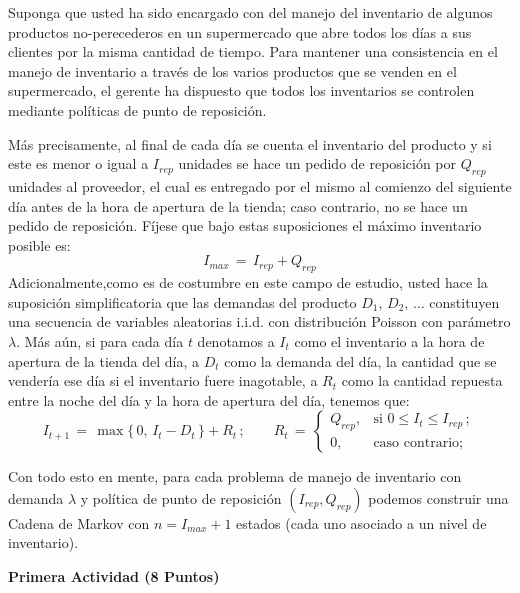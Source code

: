 \documentclass[ a4paper, twoside, 11pt]{article}
\begin{document}
\begin{problem}
Suponga que usted ha sido encargado con del manejo del inventario de algunos productos no-perecederos en un supermercado que abre todos los d\'ias a sus clientes por la misma cantidad de tiempo. Para mantener una consistencia en el manejo de inventario a trav\'es de los varios productos que se venden en el supermercado, el gerente ha dispuesto que todos los inventarios se controlen mediante pol\'iticas de punto de reposici\'on. 

M\'as precisamente, al final de cada d\'ia se cuenta el inventario del producto y si este es menor o igual a $I_{rep}$ unidades se hace un pedido de reposici\'on por $Q_{rep}$ unidades al proveedor, el cual es entregado por el mismo al comienzo del siguiente d\'ia antes de la hora de apertura de la tienda; caso contrario, no se hace un pedido de reposici\'on. F\'ijese que bajo estas suposiciones el m\'aximo inventario posible es:
\[
I_{max} \, = \, I_{rep} + Q_{rep}
\]
Adicionalmente,como es de costumbre en este campo de estudio, usted hace la suposici\'on simplificatoria que las demandas del producto $D_1, \, D_2, \, \dots$ constituyen una secuencia de variables aleatorias i.i.d. con distribuci\'on Poisson con par\'ametro $\lambda$. M\'as a\'un, si para cada d\'ia $t$ denotamos a $I_t$ como el inventario a la hora de apertura de la tienda del \tavo d\'ia, a $D_t$ como la demanda del d\'ia, \ie la cantidad que se vender\'ia ese d\'ia si el inventario fuere inagotable, a $R_t$ como la cantidad repuesta entre la noche del \tavo d\'ia y la hora de apertura del \tMavo d\'ia, tenemos que:
\[
I_{t+1} \, = \, \max \{ \, 0, \, I_t - D_t \, \} + R_t \, ; \qquad
R_t \, = \, 
\begin{cases}
Q_{rep}, & \text{si } 0 \leq I_t \leq I_{rep} \, ; \\
0, & \text{caso contrario;}
\end{cases}
\]

Con todo esto en mente, para cada problema de manejo de inventario con demanda $\lambda$ y pol\'itica de punto de reposici\'on $(I_{rep},Q_{rep})$ podemos construir una Cadena de Markov con \linebreak $n = I_{max} + 1$ estados (cada uno asociado a un nivel de inventario). 

\textbf{Primera Actividad (8 Puntos)}


\end{problem}
\end{document}
